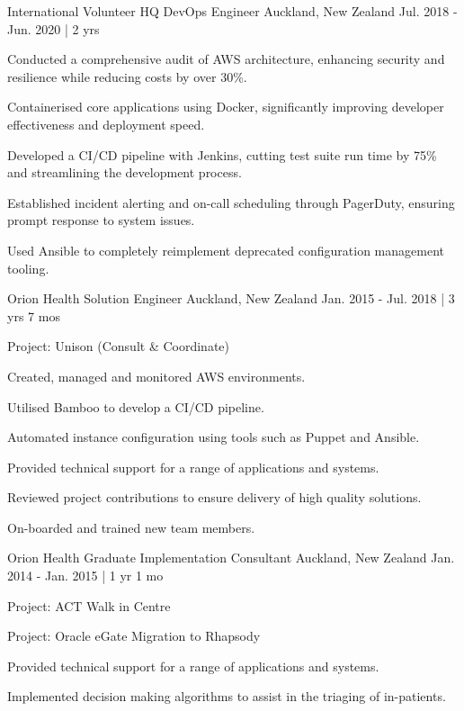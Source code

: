 \begin{cventries}
\cventry
{International Volunteer HQ} %
{DevOps Engineer} %
{Auckland, New Zealand} %
{Jul. 2018 - Jun. 2020 | 2 yrs} %
{ %
\begin{cvitems}
\item {Conducted a comprehensive audit of AWS architecture, enhancing security and resilience while reducing costs by over 30\%.}
\item {Containerised core applications using Docker, significantly improving developer effectiveness and deployment speed.}
\item {Developed a CI/CD pipeline with Jenkins, cutting test suite run time by 75\% and streamlining the development process.}
\item {Established incident alerting and on-call scheduling through PagerDuty, ensuring prompt response to system issues.}
\item {Used Ansible to completely reimplement deprecated configuration management tooling.}
\end{cvitems}
}


\cventry
{Orion Health} %
{Solution Engineer} %
{Auckland, New Zealand} %
{Jan. 2015 - Jul. 2018 | 3 yrs 7 mos} %
{ %
\begin{cvitems}
\item {Project: Unison (Consult \& Coordinate)}
\item {Created, managed and monitored AWS environments.}
\item {Utilised Bamboo to develop a CI/CD pipeline.}
\item {Automated instance configuration using tools such as Puppet and }Ansible.
\item {Provided technical support for a range of applications and }systems.
\item {Reviewed project contributions to ensure delivery of high quality }solutions.
\item {On-boarded and trained new team members.}
\end{cvitems}
}


\cventry
{Orion Health} %
{Graduate Implementation Consultant} %
{Auckland, New Zealand} %
{Jan. 2014 - Jan. 2015 | 1 yr 1 mo} %
{ %
\begin{cvitems}
\item {Project: ACT Walk in Centre}
\item {Project: Oracle eGate Migration to Rhapsody}
\item {Provided technical support for a range of applications and systems.}
\item {Implemented decision making algorithms to assist in the triaging of in-patients.}
\end{cvitems}
}


\end{cventries}
